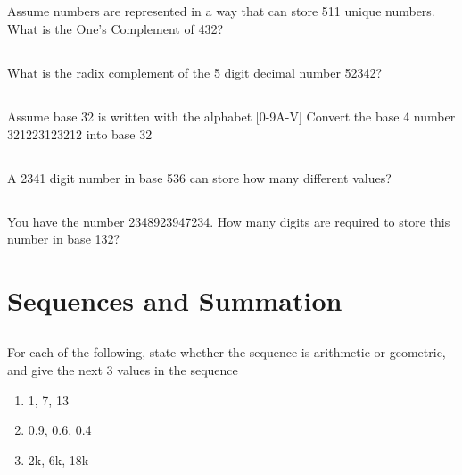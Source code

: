 \documentclass[twocolumn]{article}
\begin{document}
\subsection{}

    Assume numbers are represented in a way that can store 511 unique numbers. What is the One’s Complement of 432?

\subsection{}

    What is the radix complement of the 5 digit decimal number 52342?

\subsection{}

    Assume base 32 is written with the alphabet [0-9A-V] Convert the base 4 number 321223123212 into base 32

\subsection{}

    A 2341 digit number in base 536 can store how many different values?

\subsection{}

    You have the number 2348923947234. How many digits are required to store this number in base 132?

\clearpage
\section{Sequences and Summation}

\subsection{}

    For each of the following, state whether the sequence is arithmetic or geometric, and give the next 3 values in the sequence

    \begin{enumerate}
        \item 1, 7, 13
        \item 0.9, 0.6, 0.4
        \item 2k, 6k, 18k
    \end{enumerate}
\end{document}
